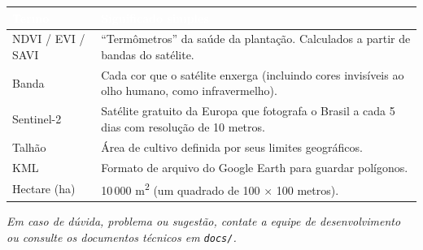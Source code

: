 \documentclass[11pt, a4paper]{article}
\begin{document}
\renewcommand{\arraystretch}{1.3}
\begin{table}[H]
\centering
\small
{}
\begin{tabularx}{\textwidth}{@{}lX@{}}
\toprule
\rowcolor{tabheader}\textcolor{white}{\textbf{Termo}} & \textcolor{white}{\textbf{Significado simples}}\\
\midrule
NDVI / EVI / SAVI & ``Termômetros'' da saúde da plantação. Calculados a partir de bandas do satélite.\\
Banda & Cada cor que o satélite enxerga (incluindo cores invisíveis ao olho humano, como infravermelho).\\
Sentinel-2 & Satélite gratuito da Europa que fotografa o Brasil a cada 5 dias com resolução de 10 metros.\\
Talhão & Área de cultivo definida por seus limites geográficos.\\
KML & Formato de arquivo do Google Earth para guardar polígonos.\\
Hectare (ha) & 10\,000 m\textsuperscript{2} (um quadrado de 100 $\times$ 100 metros).\\
\bottomrule
\end{tabularx}
\end{table}

\vfill
\begin{center}
\small\textit{Em caso de dúvida, problema ou sugestão, contate a equipe de desenvolvimento\\ou consulte os documentos técnicos em \texttt{docs/}.}
\end{center}
\end{document}
